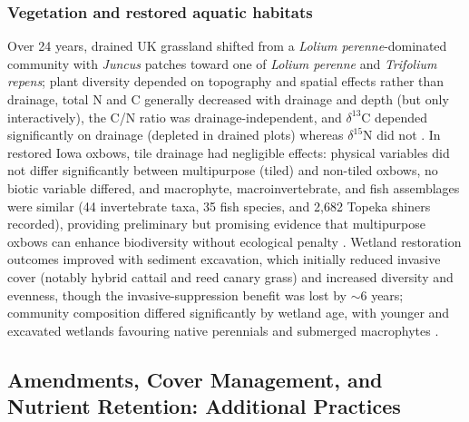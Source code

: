 \subsubsection{Vegetation and restored aquatic habitats}
Over 24 years, drained UK grassland shifted from a \textit{Lolium perenne}-dominated community with \textit{Juncus} patches toward one of \textit{Lolium perenne} and \textit{Trifolium repens}; plant diversity depended on topography and spatial effects rather than drainage, total N and C generally decreased with drainage and depth (but only interactively), the C/N ratio was drainage-independent, and $\delta^{13}$C depended significantly on drainage (depleted in drained plots) whereas $\delta^{15}$N did not \parencite{Harris2018}. In restored Iowa oxbows, tile drainage had negligible effects: physical variables did not differ significantly between multipurpose (tiled) and non-tiled oxbows, no biotic variable differed, and macrophyte, macroinvertebrate, and fish assemblages were similar (44 invertebrate taxa, 35 fish species, and 2{,}682 Topeka shiners recorded), providing preliminary but promising evidence that multipurpose oxbows can enhance biodiversity without ecological penalty \parencite{Leberg2024}. Wetland restoration outcomes improved with sediment excavation, which initially reduced invasive cover (notably hybrid cattail and reed canary grass) and increased diversity and evenness, though the invasive-suppression benefit was lost by $\sim$6 years; community composition differed significantly by wetland age, with younger and excavated wetlands favouring native perennials and submerged macrophytes \parencite{Winikoff2020}.

\subsection{Amendments, Cover Management, and Nutrient Retention: Additional Practices}

